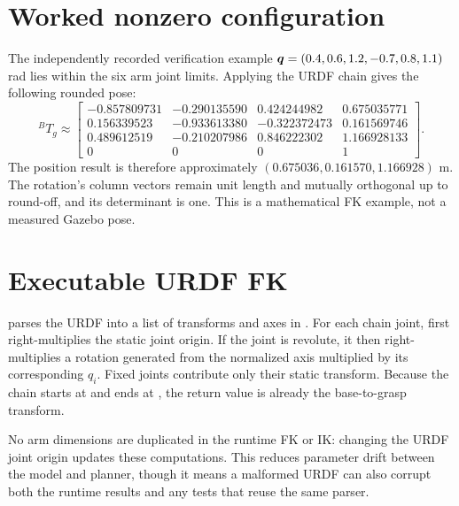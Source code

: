 \section{Worked nonzero configuration}
The independently recorded verification example
$\bm{q}=(0.4,0.6,1.2,-0.7,0.8,1.1)$ rad lies within the six arm joint limits.
Applying the URDF chain gives the following rounded pose:
\begin{equation}
{}^BT_g\approx\begin{bmatrix}
-0.857809731&-0.290135590&0.424244982&0.675035771\\
0.156339523&-0.933613380&-0.322372473&0.161569746\\
0.489612519&-0.210207986&0.846222302&1.166928133\\
0&0&0&1
\end{bmatrix}.
\label{eq:fk-nonzero-example}
\end{equation}
The position result is therefore approximately
$(0.675036,0.161570,1.166928)$ m. The rotation's column vectors remain unit
length and mutually orthogonal up to round-off, and its determinant is one.
This is a mathematical FK example, not a measured Gazebo pose.

\section{Executable URDF FK}
 parses the URDF into a list of transforms and
axes in . For each chain joint,
 first right-multiplies the static joint origin. If the joint is
revolute, it then right-multiplies a rotation generated from the normalized
axis multiplied by its corresponding $q_i$. Fixed joints contribute only
their static transform. Because the chain starts at  and
ends at , the return value is already the base-to-grasp
transform.

No arm dimensions are duplicated in the runtime FK or IK: changing the URDF
joint origin updates these computations. This reduces parameter drift between
the model and planner, though it means a malformed URDF can also corrupt both
the runtime results and any tests that reuse the same parser.

